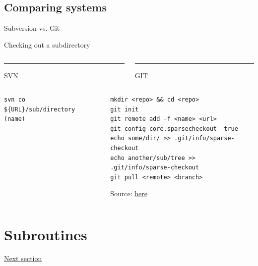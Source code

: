 \documentclass[xcolor=table,compress]{beamer}
\begin{document}
\subsection{Comparing systems}
\begin{frame}[fragile]{Subversion vs. Git}
\small

\begin{block}{Checking out a subdirectory}
\begin{columns}
\begin{column}{.48\textwidth}
\color{red}\rule{\linewidth}{4pt}

SVN
\end{column}%
\hfill%
\begin{column}{.48\textwidth}
\color{blue}\rule{\linewidth}{4pt}

GIT
\end{column}%
\end{columns}
\begin{columns}
\begin{column}{.48\textwidth}
\color{red}
\begin{lstlisting}
svn co ${URL}/sub/directory (name)
\end{lstlisting}
\end{column}%
\hfill%
\begin{column}{.48\textwidth}
\color{blue}\tiny
\begin{lstlisting}
mkdir <repo> && cd <repo>
git init
git remote add -f <name> <url>
git config core.sparsecheckout  true
echo some/dir/ >> .git/info/sparse-checkout
echo another/sub/tree >>  .git/info/sparse-checkout
git pull <remote> <branch>
\end{lstlisting}
{\tiny Source: \href{http://jasonkarns.com/blog/subdirectory-checkouts-with-git-sparse-checkout/}{here}}
\end{column}%

\end{columns}
\end{block}
\end{frame}

\section{Subroutines}
\begin{frame}
\href{day1-3.pdf}{Next section}
\end{frame}
\end{document}
